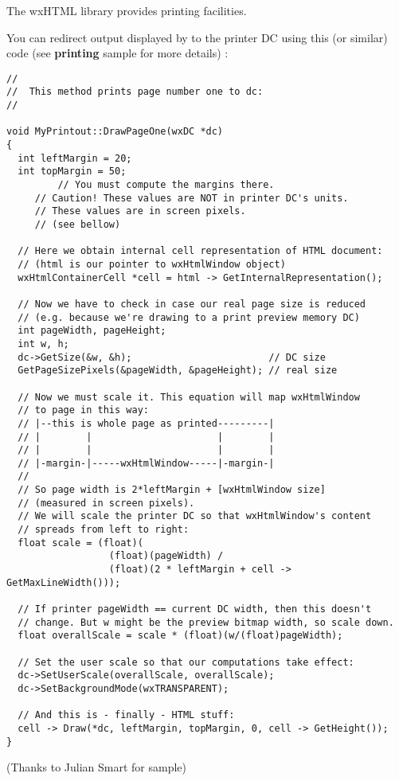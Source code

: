 \label{printing}

The wxHTML library provides printing facilities. 

You can redirect output displayed by 
to the printer DC using this (or similar) code (see {\bf printing} sample for
more details) :

\begin{verbatim}
//
//  This method prints page number one to dc:
//

void MyPrintout::DrawPageOne(wxDC *dc)
{
  int leftMargin = 20;
  int topMargin = 50;
         // You must compute the margins there. 
	 // Caution! These values are NOT in printer DC's units.
	 // These values are in screen pixels.
	 // (see bellow)

  // Here we obtain internal cell representation of HTML document:
  // (html is our pointer to wxHtmlWindow object)
  wxHtmlContainerCell *cell = html -> GetInternalRepresentation();

  // Now we have to check in case our real page size is reduced
  // (e.g. because we're drawing to a print preview memory DC)
  int pageWidth, pageHeight;
  int w, h;
  dc->GetSize(&w, &h);                        // DC size
  GetPageSizePixels(&pageWidth, &pageHeight); // real size

  // Now we must scale it. This equation will map wxHtmlWindow
  // to page in this way:
  // |--this is whole page as printed---------|
  // |        |                      |        |
  // |        |                      |        |
  // |-margin-|-----wxHtmlWindow-----|-margin-|
  //
  // So page width is 2*leftMargin + [wxHtmlWindow size]
  // (measured in screen pixels).
  // We will scale the printer DC so that wxHtmlWindow's content
  // spreads from left to right:
  float scale = (float)(
                  (float)(pageWidth) /
                  (float)(2 * leftMargin + cell -> GetMaxLineWidth()));

  // If printer pageWidth == current DC width, then this doesn't
  // change. But w might be the preview bitmap width, so scale down.
  float overallScale = scale * (float)(w/(float)pageWidth);

  // Set the user scale so that our computations take effect:
  dc->SetUserScale(overallScale, overallScale);
  dc->SetBackgroundMode(wxTRANSPARENT);

  // And this is - finally - HTML stuff:
  cell -> Draw(*dc, leftMargin, topMargin, 0, cell -> GetHeight());
}
\end{verbatim}

(Thanks to Julian Smart for sample)

